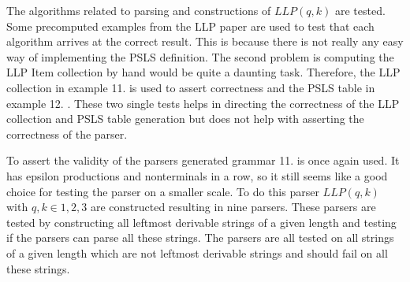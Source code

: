 The algorithms related to parsing and constructions of $LLP(q, k)$ are tested. Some precomputed examples from the LLP paper \cite{Vagner2007} are used to test that each algorithm arrives at the correct result. This is because there is not really any easy way of implementing the PSLS definition. The second problem is computing the LLP Item collection by hand would be quite a daunting task. Therefore, the LLP collection in example 11. \cite[14]{Vagner2007} is used to assert correctness and the PSLS table in example 12. \cite[14]{Vagner2007}. These two single tests helps in directing the correctness of the LLP collection and PSLS table generation but does not help with asserting the correctness of the parser.

To assert the validity of the parsers generated grammar 11. \cite[14]{Vagner2007} is once again used. It has epsilon productions and nonterminals in a row, so it still seems like a good choice for testing the parser on a smaller scale. To do this parser $LLP(q, k)$ with $q, k \in {1, 2, 3}$ are constructed resulting in nine parsers. These parsers are tested by constructing all leftmost derivable strings of a given length and testing if the parsers can parse all these strings. The parsers are all tested on all strings of a given length which are not leftmost derivable strings and should fail on all these strings.
